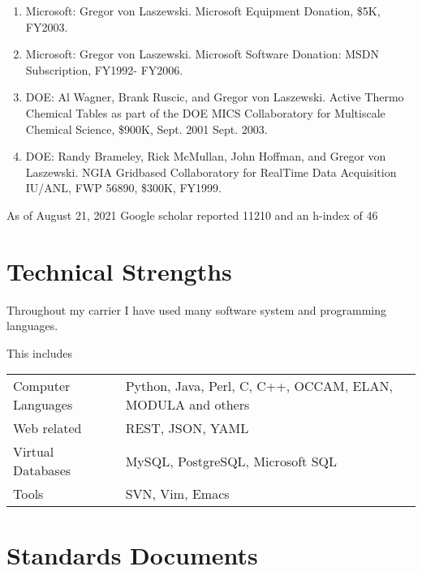 \documentclass{article}
\begin{document}
\begin{enumerate}
\item  Microsoft: Gregor von Laszewski. Microsoft Equipment Donation, \$5K, FY2003. 
\item  Microsoft: Gregor von Laszewski. Microsoft Software Donation: MSDN Subscription, FY1992- FY2006. 
\item  DOE: Al Wagner, Brank Ruscic, and Gregor von Laszewski. Active Thermo Chemical Tables as part of the DOE MICS Collaboratory for Multiscale Chemical Science, \$900K, Sept. 2001 Sept. 2003. 
\item  DOE: Randy Brameley, Rick McMullan, John Hoffman, and Gregor von Laszewski. NGIA Gridbased Collaboratory for RealTime Data Acquisition IU/ANL, FWP 56890, \$300K, FY1999.

\end{enumerate}    


As of August 21, 2021 Google scholar reported 11210 and an h-index of 46



\section{Technical Strengths}

Throughout my carrier I have used many software system and programming languages.

This includes
\begin{tabular}{ll}
Computer Languages & Python, Java, Perl, C, C++, OCCAM, ELAN, MODULA and others\\
Web related & REST, JSON, YAML \\
Virtual 
Databases & MySQL, PostgreSQL, Microsoft SQL \\
Tools & SVN, Vim, Emacs
\end{tabular}




\section{Standards Documents}
\end{document}
